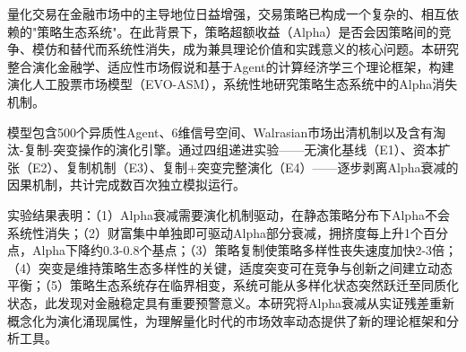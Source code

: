 ﻿量化交易在金融市场中的主导地位日益增强，交易策略已构成一个复杂的、相互依赖的"策略生态系统"。在此背景下，策略超额收益（Alpha）是否会因策略间的竞争、模仿和替代而系统性消失，成为兼具理论价值和实践意义的核心问题。本研究整合演化金融学、适应性市场假说和基于Agent的计算经济学三个理论框架，构建演化人工股票市场模型（EVO-ASM），系统性地研究策略生态系统中的Alpha消失机制。

模型包含500个异质性Agent、6维信号空间、Walrasian市场出清机制以及含有淘汰-复制-突变操作的演化引擎。通过四组递进实验——无演化基线（E1）、资本扩张（E2）、复制机制（E3）、复制+突变完整演化（E4）——逐步剥离Alpha衰减的因果机制，共计完成数百次独立模拟运行。

实验结果表明：（1）Alpha衰减需要演化机制驱动，在静态策略分布下Alpha不会系统性消失；（2）财富集中单独即可驱动Alpha部分衰减，拥挤度每上升1个百分点，Alpha下降约0.3-0.8个基点；（3）策略复制使策略多样性丧失速度加快2-3倍；（4）突变是维持策略生态多样性的关键，适度突变可在竞争与创新之间建立动态平衡；（5）策略生态系统存在临界相变，系统可能从多样化状态突然跃迁至同质化状态，此发现对金融稳定具有重要预警意义。本研究将Alpha衰减从实证残差重新概念化为演化涌现属性，为理解量化时代的市场效率动态提供了新的理论框架和分析工具。
